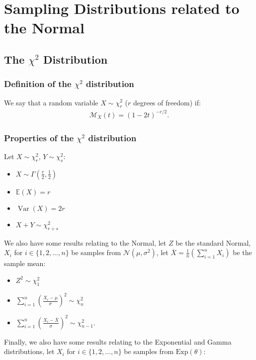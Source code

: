 \documentclass[a4paper, 12pt, twoside]{article}
\DeclareMathOperator{\Var}{Var}
\begin{document}
\section{Sampling Distributions related to the Normal}

\subsection{The $\chi^2$ Distribution}

\subsubsection{Definition of the $\chi^2$ distribution}

We say that a random variable $X \sim \chi^2_r$ ($r$ degrees of freedom)
if:
\begin{align*}
    \mathcal{M}_X(t) = (1 - 2t)^{-r / 2}.
\end{align*}

\subsubsection{Properties of the $\chi^2$ distribution}

Let $X \sim \chi^2_r$, $Y \sim \chi^2_s$:

\begin{itemize}
    \item $X \sim \Gamma(\frac{r}{2}, \frac{1}{2})$
    \item $\mathbb{E}(X) = r$
    \item $\Var(X) = 2r$
    \item $X + Y \sim \chi^2_{r + s}$
\end{itemize}

We also have some results relating to the Normal, let $Z$ be the standard
Normal, $X_i$ for $i \in \{1, 2, \ldots, n\}$ be samples from
$\mathcal{N}(\mu, \sigma^2)$, let $\overline{X} = \frac{1}{n}
    (\sum_{i = 1}^n X_i)$ be the sample mean:

\begin{itemize}
    \item $Z^2 \sim \chi^2_1$
    \item $\sum_{i = 1}^n (\frac{X_i - \mu}{\sigma})^2 \sim \chi^2_n$
    \item $\sum_{i = 1}^n (\frac{X_i - \overline{X}}{\sigma})^2 \sim \chi^2_{n-1}$.
\end{itemize}

Finally, we also have some results relating to the Exponential and Gamma
distributions, let $X_i$ for $i \in \{1, 2, \ldots, n\}$ be samples
from $\text{Exp}(\theta)$:
\end{document}
